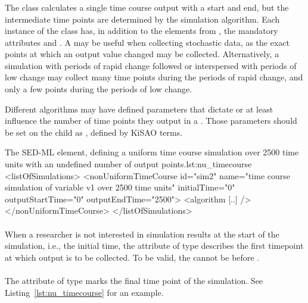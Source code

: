 \begin{blockChanged}
\subsubsection{}
\label{class:nonUniformTimeCourse}
The \NonUniformTimeCourse class calculates a single time course output with a start and end, but the intermediate time points are determined by the simulation algorithm. Each instance of the \NonUniformTimeCourse class has, in addition to the elements from \TimeCourse, the mandatory attributes \hyperref[sec:nu_outputStartTime]{} and \hyperref[sec:nu_outputEndTime]{}. A \NonUniformTimeCourse may be useful when collecting stochastic data, as the exact points at which an output value changed may be collected.  Alternatively, a simulation with periods of rapid change followed or interspersed with periods of low change may collect many time points during the periods of rapid change, and only a few points during the periods of low change.

Different algorithms may have defined parameters that dictate or at least influence the number of time points they output in a \NonUniformTimeCourse.  Those parameters should be set on the child \Algorithm as \AlgorithmParameters, defined by KiSAO terms. 

\begin{myXmlLst}{The SED-ML  element, defining a uniform time course simulation over 2500 time units with an undefined number of output points.}{lst:nu_timecourse}
<listOfSimulations>
	<nonUniformTimeCourse id="sim2"  name="time course simulation of variable v1 over 2500 time units"  
		initialTime="0" outputStartTime="0" outputEndTime="2500">
		<algorithm [..] />
 	</nonUniformTimeCourse>
</listOfSimulations>
\end{myXmlLst}

\paragraph*{}
\label{sec:nu_outputStartTime}
When a researcher is not interested in simulation results at the start of the simulation, i.e., the initial time, the attribute  of type  describes the first timepoint at which output is to be collected. To be valid, the  cannot be before \hyperref[sec:initialTime]{}.

\paragraph*{}
\label{sec:nu_outputEndTime}
The attribute  of type  marks the final time point of the simulation. See Listing~\ref{lst:nu_timecourse} for an example. 

\end{blockChanged}

